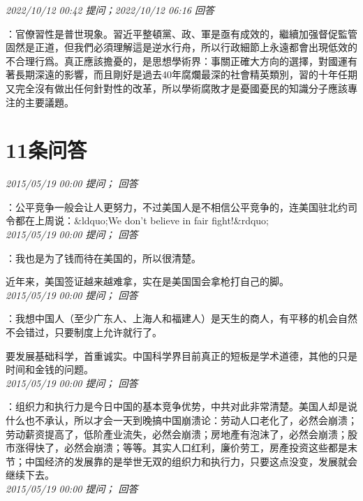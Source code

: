 \documentclass[twocolumn]{ctexart}
\begin{document}
\textit{\hfill\noindent\small 2022/10/12 00:42 提问；2022/10/12 06:16 回答}

：官僚習性是普世現象。習近平整頓黨、政、軍是亟有成效的，繼續加强督促監管固然是正道，但我們必須理解這是逆水行舟，所以行政細節上永遠都會出現低效的不合理行爲。真正應該擔憂的，是思想學術界：事關正確大方向的選擇，對國運有著長期深遠的影響，而且剛好是過去40年腐爛最深的社會精英類別，習的十年任期又完全沒有做出任何針對性的改革，所以學術腐敗才是憂國憂民的知識分子應該專注的主要議題。
\\

\section{11条问答}

\textit{\hfill\noindent\small 2015/05/19 00:00 提问； 回答}

：公平竞争一般会让人更努力，不过美国人是不相信公平竞争的，连美国驻北约司令都在上周说：\&ldquo;We don't believe in fair fight!\&rdquo;\\

\textit{\hfill\noindent\small 2015/05/19 00:00 提问； 回答}

：我也是为了钱而待在美国的，所以很清楚。

近年来，美国签证越来越难拿，实在是美国国会拿枪打自己的脚。\\

\textit{\hfill\noindent\small 2015/05/19 00:00 提问； 回答}

：我想中国人（至少广东人、上海人和福建人）是天生的商人，有平移的机会自然不会错过，只要制度上允许就行了。

要发展基础科学，首重诚实。中国科学界目前真正的短板是学术道德，其他的只是时间和金钱的问题。\\

\textit{\hfill\noindent\small 2015/05/19 00:00 提问； 回答}

：组织力和执行力是今日中国的基本竞争优势，中共对此非常清楚。美国人却是说什么也不承认，所以才会一天到晚搞中国崩溃论：劳动人口老化了，必然会崩溃；劳动薪资提高了，低阶產业流失，必然会崩溃；房地產有泡沫了，必然会崩溃；股市涨得快了，必然会崩溃；等等。其实人口红利，廉价劳工，房產投资这些都是末节；中国经济的发展靠的是举世无双的组织力和执行力，只要这点没变，发展就会继续下去。\\

\textit{\hfill\noindent\small 2015/05/19 00:00 提问； 回答}
\end{document}
